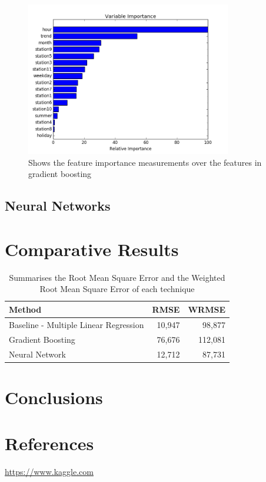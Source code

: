 \documentclass{article} %
\begin{document}
\begin{figure}[H]
  \centering
    \includegraphics[width=0.80\textwidth]{boost_imp}
  \caption{Shows the feature importance measurements over the features in gradient boosting}
  \label{fig:boost_imp}
\end{figure}


\subsection*{Neural Networks}

\section*{Comparative Results}

\begin{table}[H]
  \begin{tabular}{l r r}
    Method  & RMSE & WRMSE \\
    \hline
    Baseline - Multiple Linear Regression	& 10,947 & 98,877 \\
    Gradient Boosting						& 76,676 & 112,081 \\
    Neural Network							& 12,712 & 87,731 \\
    \hline
  \end{tabular}
  \caption{Summarises the Root Mean Square Error and the Weighted Root Mean Square Error of each technique}
  \label{tab:error_comp}
\end{table}
\section*{Conclusions}


\section*{References}
\url{https://www.kaggle.com}
\end{document}
